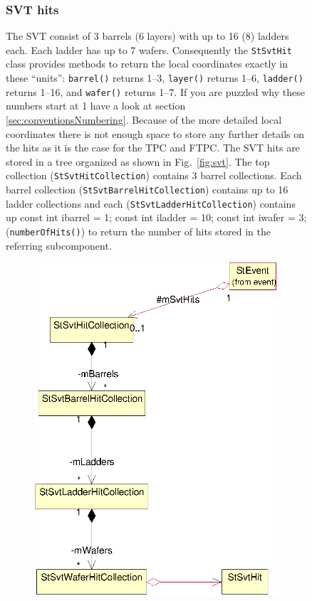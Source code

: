 \documentclass[twoside]{article}
\begin{document}
\begin{figure}[htb]
\begin{center}
\subsubsection{SVT hits}
   
 

The SVT consist of 3 barrels (6 layers) with up to 16 (8) ladders
each. Each ladder has up to 7 wafers. Consequently the
\texttt{StSvtHit} class provides methods to return the local
coordinates exactly in these ``units'': \texttt{barrel()} returns
1--3, \texttt{layer()} returns 1--6, \texttt{ladder()} returns 1--16,
and \texttt{wafer()} returns 1--7. If you are puzzled why these
numbers start at 1 have a look at section
\ref{sec:conventionsNumbering}.  Because of the more detailed local
coordinates there is not enough space to store any further details on
the hits as it is the case for the TPC and FTPC.  The SVT hits are
stored in a tree organized as shown in Fig.~\ref{fig:svt}.  The top
collection (\texttt{StSvtHitCollection}) contains 3 barrel
collections.  Each barrel collection
(\texttt{StSvtBarrelHitCollection}) contains up to 16 ladder
collections and each (\texttt{StSvtLadderHitCollection}) contains up
const int ibarrel  = 1;
const int iladder  = 10;
const int iwafer   = 3;
(\texttt{numberOfHits()}) to return the number of hits stored in the
referring subcomponent. 
\begin{figure}[htb]
    \begin{center}
        \includegraphics{svt.eps}

\end{center}
\end{figure}
\end{center}
\end{figure}
\end{document}
